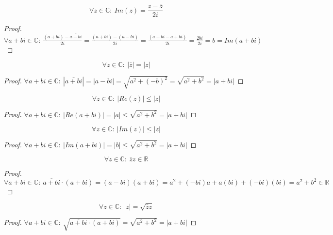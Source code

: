 \documentclass[main.tex]{subfiles}
\begin{document}
\begin{pr}
  \[ \forall z\in \mathbb{C}:\ Im(z) = \frac{z-\bar{z}}{2i} \]

  \begin{proof}
    $\forall a+bi\in \mathbb{C}:\ \frac{(a+bi)-\overline{a+bi}}{2i} = \frac{(a+bi)-(a-bi)}{2i} = \frac{(a+bi-a+bi)}{2i} = \frac{2bi}{2i} = b = Im(a+bi) $
  \end{proof}
\end{pr}

\begin{pr}
  \[ \forall z\in \mathbb{C}:\ |\bar{z}| = |z| \]

  \begin{proof}
    $\forall a+bi\in \mathbb{C}:\ |\bar{a+bi}| = |a-bi| = \sqrt{a^{2}+(-b)^{2}} = \sqrt{a^{2}+b^{2}} = |a+bi|$
  \end{proof}
\end{pr}

\begin{pr}
  \label{pr:reel-deel-kleine}
  \[ \forall z\in \mathbb{C}:\ |Re(z)| \le |z| \]

  \begin{proof}
    $\forall a+bi\in \mathbb{C}:\  |Re(a+bi)| = |a| \le \sqrt{a^{2}+b^{2}} = |a+bi|$ 
  \end{proof}
\end{pr}

\begin{pr}
  \label{pr:imaginair-deel-kleiner}
  \[ \forall z\in \mathbb{C}:\ |Im(z)| \le |z|\]

  \begin{proof}
    $\forall a+bi\in \mathbb{C}:\  |Im(a+bi)| = |b| \le \sqrt{a^{2}+b^{2}} = |a+bi|$ 
  \end{proof}
\end{pr}

\begin{pr}
  \[ \forall z\in \mathbb{C}:\ \bar{z}z\in \mathbb{R} \]

  \begin{proof}
    $\forall a+bi\in \mathbb{C}:\  \overline{a+bi}\cdot(a+bi) = (a-bi)(a+bi) = a^{2} + (-bi)a + a(bi) + (-bi)(bi) = a^{2} + b^{2} \in \mathbb{R}$
  \end{proof}
\end{pr}

\begin{pr}
  \[ \forall z\in \mathbb{C}:\ |z| = \sqrt{\bar{z}z} \]

  \begin{proof}
    $\forall a+bi\in \mathbb{C}:\ \sqrt{\overline{a+bi}\cdot(a+bi)} = \sqrt{a^{2}+b^{2}} = |a+bi|$
  \end{proof}
\end{pr}
\end{document}
